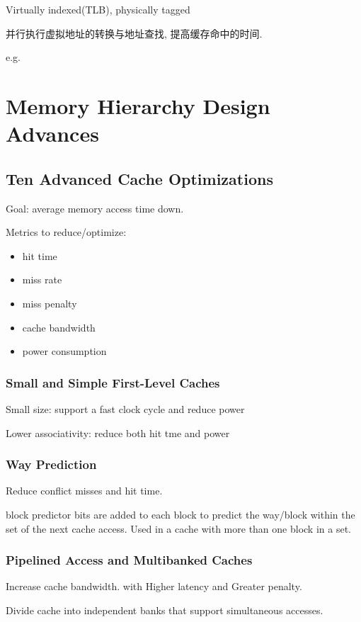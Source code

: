 Virtually indexed(TLB), physically tagged

并行执行虚拟地址的转换与地址查找, 提高缓存命中的时间. 


e.g. %


\newpage
\section{Memory Hierarchy Design Advances}
\subsection{Ten Advanced Cache Optimizations}
Goal: average memory access time down. 

Metrics to reduce/optimize:
\begin{itemize}
    \item hit time
    \item miss rate
    \item miss penalty
    \item cache bandwidth
    \item power consumption
\end{itemize}

\subsubsection{Small and Simple First-Level Caches}
Small size: support a fast clock cycle and reduce power

Lower associativity: reduce both hit tme and power

\subsubsection{Way Prediction}
Reduce conflict misses and hit time. 

block predictor bits are added to each block to predict the way/block within the set of the next cache access. Used in a cache with more than one
block in a set. 

\subsubsection{Pipelined Access and Multibanked Caches}
Increase cache bandwidth. with Higher latency and Greater penalty. 

Divide cache into independent banks that support simultaneous accesses.


